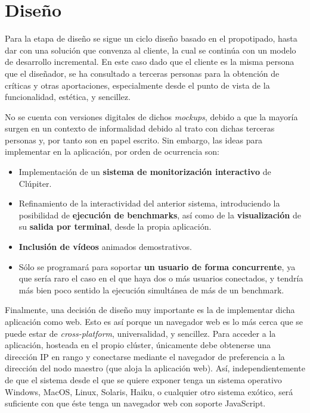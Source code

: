 \section{Diseño}
\label{sec:contenido_didactico__diseño}
Para la etapa de diseño se sigue un ciclo diseño basado en el propotipado, hasta dar con una solución que convenza al cliente, la cual se continúa con un modelo de desarrollo incremental. En este caso dado que el cliente es la misma persona que el diseñador, se ha consultado a terceras personas para la obtención de críticas y otras aportaciones, especialmente desde el punto de vista de la funcionalidad, estética, y sencillez.

No se cuenta con versiones digitales de dichos \textit{mockups}, debido a que la mayoría surgen en un contexto de informalidad debido al trato con dichas terceras personas y, por tanto son en papel escrito. Sin embargo, las ideas para implementar en la aplicación, por orden de ocurrencia son:

\begin{itemize}
  \item Implementación de un \textbf{sistema de monitorización interactivo} de Clúpiter.
  \item Refinamiento de la interactividad del anterior sistema, introduciendo la posibilidad de \textbf{ejecución de benchmarks}, así como de la \textbf{visualización} de su \textbf{salida por terminal}, desde la propia aplicación.
  \item \textbf{Inclusión de vídeos} animados demostrativos.
  \item Sólo se programará para soportar \textbf{un usuario de forma concurrente}, ya que sería raro el caso en el que haya dos o más usuarios conectados, y tendría más bien poco sentido la ejecución simultánea de más de un benchmark.
\end{itemize}

Finalmente, una decisión de diseño muy importante es la de implementar dicha aplicación como web. Esto es así porque un navegador web es lo más cerca que se puede estar de \textit{cross-platform}, universalidad, y sencillez. Para acceder a la aplicación, hosteada en el propio clúster, únicamente debe obtenerse una dirección IP en rango y conectarse mediante el navegador de preferencia a la dirección del nodo maestro (que aloja la aplicación web). Así, independientemente de que el sistema desde el que se quiere exponer tenga un sistema operativo Windows, MacOS, Linux, Solaris, Haiku, o cualquier otro sistema exótico, será suficiente con que éste tenga un navegador web con soporte JavaScript.

